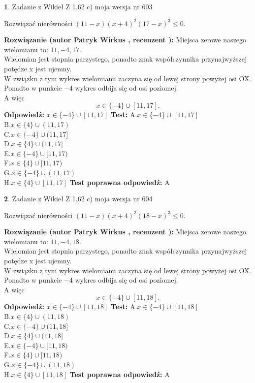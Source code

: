 \documentclass[12pt, a4paper]{article}
\theoremstyle{definition} %
\newtheorem{zad}{}
\newcommand{\zadStart}[1]{\begin{zad}#1\newline}
\newcommand{\zadStop}{\end{zad}}
\newcommand{\rozwStart}[2]{\noindent \textbf{Rozwiązanie (autor #1 , recenzent #2): }\newline}
\newcommand{\rozwStop}{\newline}
\newcommand{\odpStart}{\noindent \textbf{Odpowiedź:}\newline}
\newcommand{\odpStop}{\newline}
\newcommand{\testStart}{\noindent \textbf{Test:}\newline}
\newcommand{\testStop}{\newline}
\newcommand{\kluczStart}{\noindent \textbf{Test poprawna odpowiedź:}\newline}
\newcommand{\kluczStop}{\newline}
\begin{document}
\zadStart{Zadanie z Wikieł Z 1.62 c) moja wersja nr 603}

Rozwiązać nierówności $(11-x)(x+4)^{2}(17-x)^{3}\le0$.
\zadStop
\rozwStart{Patryk Wirkus}{}
Miejsca zerowe naszego wielomianu to: $11, -4, 17$.\\
Wielomian jest stopnia parzystego, ponadto znak współczynnika przy\linebreak najwyższej potędze x jest ujemny.\\ W związku z tym wykres wielomianu zaczyna się od lewej strony powyżej osi OX.\\
Ponadto w punkcie $-4$ wykres odbija się od osi poziomej.\\
A więc $$x \in \{-4\} \cup [11,17].$$
\rozwStop
\odpStart
$x \in \{-4\} \cup [11,17]$
\odpStop
\testStart
A.$x \in \{-4\} \cup [11,17]$\\
B.$x \in \{4\} \cup (11,17)$\\
C.$x \in \{-4\} \cup (11,17]$\\
D.$x \in \{4\} \cup (11,17]$\\
E.$x \in \{-4\} \cup [11,17)$\\
F.$x \in \{4\} \cup [11,17)$\\
G.$x \in \{-4\} \cup (11,17)$\\
H.$x \in \{4\} \cup [11,17]$
\testStop
\kluczStart
A
\kluczStop



\zadStart{Zadanie z Wikieł Z 1.62 c) moja wersja nr 604}

Rozwiązać nierówności $(11-x)(x+4)^{2}(18-x)^{3}\le0$.
\zadStop
\rozwStart{Patryk Wirkus}{}
Miejsca zerowe naszego wielomianu to: $11, -4, 18$.\\
Wielomian jest stopnia parzystego, ponadto znak współczynnika przy\linebreak najwyższej potędze x jest ujemny.\\ W związku z tym wykres wielomianu zaczyna się od lewej strony powyżej osi OX.\\
Ponadto w punkcie $-4$ wykres odbija się od osi poziomej.\\
A więc $$x \in \{-4\} \cup [11,18].$$
\rozwStop
\odpStart
$x \in \{-4\} \cup [11,18]$
\odpStop
\testStart
A.$x \in \{-4\} \cup [11,18]$\\
B.$x \in \{4\} \cup (11,18)$\\
C.$x \in \{-4\} \cup (11,18]$\\
D.$x \in \{4\} \cup (11,18]$\\
E.$x \in \{-4\} \cup [11,18)$\\
F.$x \in \{4\} \cup [11,18)$\\
G.$x \in \{-4\} \cup (11,18)$\\
H.$x \in \{4\} \cup [11,18]$
\testStop
\kluczStart
A
\kluczStop
\end{document}
